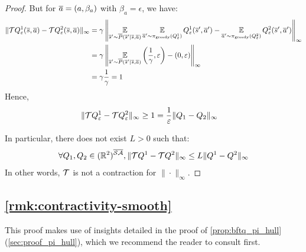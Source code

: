 \begin{proof}
But for $\overline{a}=(a,\beta_a)$ with $\beta_a = \epsilon$, we have:
\begin{align*}
    \|\mathcal{T} Q_\varepsilon^1(\overline{s}, \overline{a}) - \mathcal{T} Q_\varepsilon^2(\overline{s}, \overline{a})\|_\infty &= \gamma\left\|\operatorname*{\mathbb{E}}\limits_{\overline{s}'\sim\overline{P}(\overline{s}'|\overline{s},\overline{a})} \operatorname*{\mathbb{E}}\limits_{\overline{a}'\sim\pi_\text{greedy}(Q^1_\varepsilon)}Q^1_\varepsilon(\overline{s}',\overline{a}') - \operatorname*{\mathbb{E}}\limits_{\overline{a}'\sim\pi_\text{greedy}(Q^2_\varepsilon)}Q^2_\varepsilon(\overline{s}',\overline{a}')\right\|_\infty \\
    &= \gamma\left\|\operatorname*{\mathbb{E}}\limits_{\overline{s}'\sim\overline{P}(\overline{s}'|\overline{s},\overline{a})}\left(\frac{1}{\gamma}, \varepsilon\right) - (0, \varepsilon)\right\|_\infty \\
    &= \gamma\frac{1}{\gamma} = 1
\end{align*}
Hence, 
\begin{align*}
    \|\mathcal{T} Q_\varepsilon^1 - \mathcal{T} Q_\varepsilon^2\|_\infty &\geq 1 = \frac{1}{\varepsilon} \|Q_1-Q_2\|_\infty
\end{align*}

In particular, there does not exist $L>0$ such that:
$$\forall Q_1,Q_2\in(\mathbb{R}^2)^{\overline{\mathcal{S}}\overline{\mathcal{A}}}, \|\mathcal{T} Q^1 - \mathcal{T} Q^2\|_\infty \leq L \|Q^1 - Q^2\|_\infty$$
In other words, $\mathcal{T}$ is not a contraction for $\|\cdot\|_\infty$.
\end{proof}

\subsection{\autoref{rmk:contractivity-smooth}}
\label{proof:contraction-with-smooth}

\begin{remark}
This proof makes use of insights detailed in the proof of \autoref{prop:bftq_pi_hull} (\autoref{sec:proof_pi_hull}), which we recommend the reader to consult first.
\end{remark}

